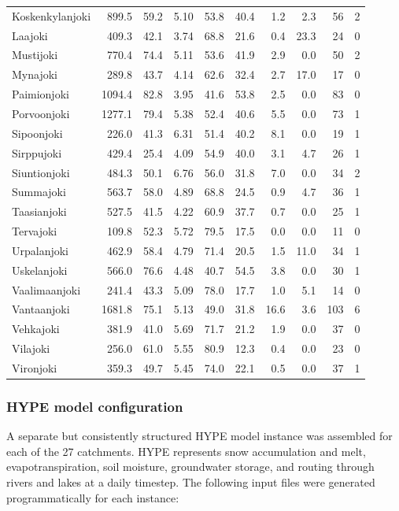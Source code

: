 \documentclass[draft]{agujournal2019}
\begin{document}
\begin{table}[p]
{\begin{tabular}{lrrrrrrrrr}
Koskenkylanjoki & 899.5 & 59.2 & 5.10 & 53.8 & 40.4 & 1.2 & 2.3 & 56 & 2 \\
Laajoki & 409.3 & 42.1 & 3.74 & 68.8 & 21.6 & 0.4 & 23.3 & 24 & 0 \\
Mustijoki & 770.4 & 74.4 & 5.11 & 53.6 & 41.9 & 2.9 & 0.0 & 50 & 2 \\
Mynajoki & 289.8 & 43.7 & 4.14 & 62.6 & 32.4 & 2.7 & 17.0 & 17 & 0 \\
Paimionjoki & 1094.4 & 82.8 & 3.95 & 41.6 & 53.8 & 2.5 & 0.0 & 83 & 0 \\
Porvoonjoki & 1277.1 & 79.4 & 5.38 & 52.4 & 40.6 & 5.5 & 0.0 & 73 & 1 \\
Sipoonjoki & 226.0 & 41.3 & 6.31 & 51.4 & 40.2 & 8.1 & 0.0 & 19 & 1 \\
Sirppujoki & 429.4 & 25.4 & 4.09 & 54.9 & 40.0 & 3.1 & 4.7 & 26 & 1 \\
Siuntionjoki & 484.3 & 50.1 & 6.76 & 56.0 & 31.8 & 7.0 & 0.0 & 34 & 2 \\
Summajoki & 563.7 & 58.0 & 4.89 & 68.8 & 24.5 & 0.9 & 4.7 & 36 & 1 \\
Taasianjoki & 527.5 & 41.5 & 4.22 & 60.9 & 37.7 & 0.7 & 0.0 & 25 & 1 \\
Tervajoki & 109.8 & 52.3 & 5.72 & 79.5 & 17.5 & 0.0 & 0.0 & 11 & 0 \\
Urpalanjoki & 462.9 & 58.4 & 4.79 & 71.4 & 20.5 & 1.5 & 11.0 & 34 & 1 \\
Uskelanjoki & 566.0 & 76.6 & 4.48 & 40.7 & 54.5 & 3.8 & 0.0 & 30 & 1 \\
Vaalimaanjoki & 241.4 & 43.3 & 5.09 & 78.0 & 17.7 & 1.0 & 5.1 & 14 & 0 \\
Vantaanjoki & 1681.8 & 75.1 & 5.13 & 49.0 & 31.8 & 16.6 & 3.6 & 103 & 6 \\
Vehkajoki & 381.9 & 41.0 & 5.69 & 71.7 & 21.2 & 1.9 & 0.0 & 37 & 0 \\
Vilajoki & 256.0 & 61.0 & 5.55 & 80.9 & 12.3 & 0.4 & 0.0 & 23 & 0 \\
Vironjoki & 359.3 & 49.7 & 5.45 & 74.0 & 22.1 & 0.5 & 0.0 & 37 & 1 \\
\bottomrule
\end{tabular}%
}
\end{table}

\subsubsection{HYPE model configuration}
A separate but consistently structured HYPE model instance was assembled for each of the 27 catchments. HYPE represents snow accumulation and melt, evapotranspiration, soil moisture, groundwater storage, and routing through rivers and lakes at a daily timestep. The following input files were generated programmatically for each instance:
\end{document}

